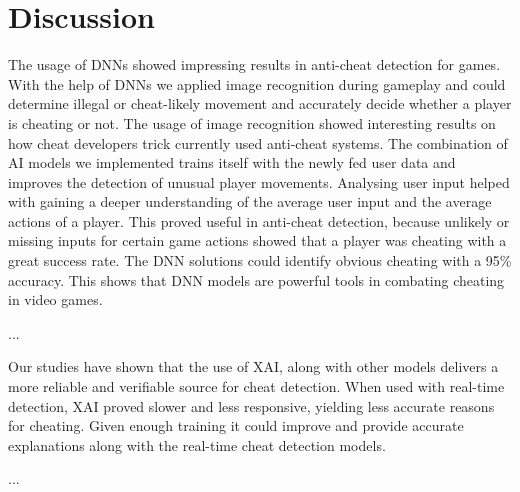\section{Discussion}
\label{ch:discussion}

The usage of DNNs showed impressing results in anti-cheat detection for games. 
With the help of DNNs we applied image recognition during gameplay and could determine illegal or cheat-likely movement and accurately decide whether a player is cheating or not. The usage of image recognition showed interesting results on how cheat developers trick currently used anti-cheat systems. The combination of AI models we implemented trains itself with the newly fed user data and improves the detection of unusual player movements. 
Analysing user input helped with gaining a deeper understanding of the average user input and the average actions of a player. This proved useful in anti-cheat detection, because unlikely or missing inputs for certain game actions showed that a player was cheating with a great success rate.
The DNN solutions could identify obvious cheating with a 95\% accuracy. This shows that DNN models are powerful tools in combating cheating in video games.

...

Our studies have shown that the use of XAI, along with other models delivers a more reliable and verifiable source for cheat detection. When used with real-time detection, XAI proved slower and less responsive, yielding less accurate reasons for cheating. Given enough training it could improve and provide accurate explanations along with the real-time cheat detection models.

...